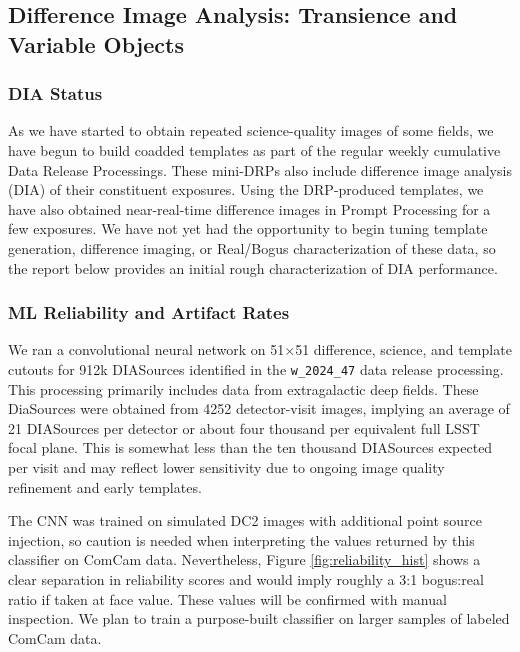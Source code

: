 \subsection{Difference Image Analysis: Transience and Variable Objects}
\label{sec:dia_transient_variable}


\subsubsection{DIA Status}

As we have started to obtain repeated science-quality images of some fields, we have begun to build coadded templates as part of the regular weekly cumulative Data Release Processings. 
These mini-DRPs also include difference image analysis (DIA) of their constituent exposures.
Using the DRP-produced templates, we have also obtained near-real-time difference images in Prompt Processing for a few exposures. 
We have not yet had the opportunity to begin tuning template generation, difference imaging, or Real/Bogus characterization of these data, so the report below provides an initial rough characterization of DIA performance. 

\subsubsection{ML Reliability and Artifact Rates}

We ran a convolutional neural network on 51$\times$51 difference, science, and template cutouts for 912k DIASources identified in the \texttt{w\_2024\_47} data release processing.  
This processing primarily includes data from extragalactic deep fields.
These DiaSources were obtained from 4252 detector-visit images, implying an average of 21 DIASources per detector or about four thousand per equivalent full LSST focal plane.
This is somewhat less than the ten thousand DIASources expected per visit and may reflect lower sensitivity due to ongoing image quality refinement and early templates.

The CNN was trained on simulated DC2 images with additional point source injection, so caution is needed when interpreting the values returned by this classifier on ComCam data.
Nevertheless,  Figure \ref{fig:reliability_hist} shows a clear separation in reliability scores and would imply roughly a 3:1 bogus:real ratio if taken at face value.
These values will be confirmed with manual inspection.
We plan to train a purpose-built classifier on larger samples of labeled ComCam data.

